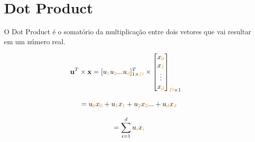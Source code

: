 \section{Dot Product}
O Dot Product é o somatório da multiplicação entre dois vetores que vai resultar em um número real.

\begin{equation}
\begin{aligned}
    \mathbf{u}^T \times \mathbf{x} = [u_{\mathcolor{orange}{1}} u_{\mathcolor{orange}{2}} ... u_{\mathcolor{orange}{d}}]^T_{1 \times\mathcolor{orange}{D} }\times 
    \begin{bmatrix}
    x_{\mathcolor{orange}{0}} \\
    x_{\mathcolor{orange}{1}} \\
    \vdots \\
    x_{\mathcolor{orange}{d}}
\end{bmatrix}_{\mathcolor{orange}{D}\times 1} \quad \\
\end{aligned}
\end{equation}

\begin{equation*}
    = u_{\mathcolor{orange}{0}}x_{\mathcolor{orange}{0}} + u_{\mathcolor{orange}{1}}x_{\mathcolor{orange}{1}} + u_{\mathcolor{orange}{2}}x_{\mathcolor{orange}{2}} ... +u_{\mathcolor{orange}{d}}x_{\mathcolor{orange}{d}}
\end{equation*}

\begin{equation*}
= \sum_{i=1}^{d} u_{\mathcolor{orange}{i}}x_{\mathcolor{orange}{i}}
\end{equation*}


